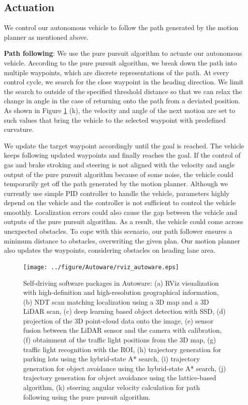 \subsection{Actuation}
\label{sec:actuation}
We control our autonomous vehicle to follow the path generated by the motion planner as mentioned above.

\textbf{Path following}:
We use the pure pursuit algorithm \cite{coulter1992implementation} to actuate our autonomous vehicle.
According to the pure pursuit algorithm, we break down the path into multiple waypoints, which are discrete representations of the path.
At every control cycle, we search for the close waypoint in the heading direction.
We limit the search to outside of the specified threshold distance so that we can relax the change in angle in the case of returning onto the path from a deviated position.
As shown in Figure \ref{fig:rviz_autoware} (k), the velocity and angle of the next motion are set to such values that bring the vehicle to the selected waypoint with predefined curvature.

We update the target waypoint accordingly until the goal is reached.
The vehicle keeps following updated waypoints and finally reaches the goal.
If the control of gas and brake stroking and steering is not aligned with the velocity and angle output of the pure pursuit algorithm because of some noise, the vehicle could temporarily get off the path generated by the motion planner.
Although we currently use simple PID controller to handle the vehicle, parameters highly depend on the vehicle and the controller is not sufficient to control the vehicle smoothly.
Localization errors could also cause the gap between the vehicle and outputs of the pure pursuit algorithm.
As a result, the vehicle could come across unexpected obstacles.
To cope with this scenario, our path follower ensures a minimum distance to obstacles, overwriting the given plan.
Our motion planner also updates the waypoints, considering obstacles on heading lane area.

\clearpage

\begin{figure}[!htbp]
  \centering
  \texttt{[image: ../figure/Autoware/rviz\_autoware.eps]}
  \caption{\label{fig:rviz_autoware}
  Self-driving software packages in Autoware:
  (a) RViz visualization with high-definition and high-resolution geographical information,
  (b) NDT scan matching localization using a 3D map and a 3D LiDAR scan,
  (c) deep learning based object detection with SSD, 
  (d) projection of the 3D point-cloud data onto the image, 
  (e) sensor fusion between the LiDAR sensor and the camera with calibration,
  (f) obtainment of the traffic light positions from the 3D map,
  (g) traffic light recognition with the ROI,
  (h) trajectory generation for parking lots using the hybrid-state A* search,
  (i) trajectory generation for object avoidance using the hybrid-state A* search,
  (j) trajectory generation for object avoidance using the lattice-based algorithm,
  (k) steering angular velocity calculation for path following using the pure pursuit algorithm.}
\end{figure}
